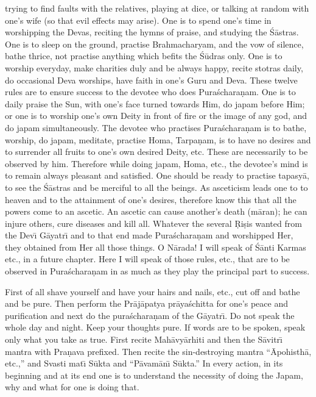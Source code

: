trying to find faults with the relatives, playing at dice, or talking at random with one's wife (so that evil effects may arise). One is to spend one's time in worshipping the Devas, reciting the hymns of praise, and studying the \'S\=astras. One is to sleep on the ground, practise Brahmacharyam, and the vow of silence, bathe thrice, not practise anything which befits the \'S\=udras only. One is to worship everyday, make charities duly and be always happy, recite stotras daily, do occasional Deva worships, have faith in one's Guru and Deva. These twelve rules are to ensure success to the devotee who does Pura\'schara\d{n}am. One is to daily praise the Sun, with one's face turned towards Him, do japam before Him; or one is to worship one's own Deity in front of fire or the image of any god, and do japam simultaneously. The devotee who practises Pura\'schara\d{n}am is to bathe, worship, do japam, meditate, practise Homa, Tarpa\d{n}am, is to have no desires and to surrender all fruits to one's own desired Deity, etc. These are necessarily to be observed by him. Therefore while doing japam, Homa, etc., the devotee's mind is to remain always pleasant and satisfied. One should be ready to practise tapasy\=a, to see the \'S\=astras and be merciful to all the beings. As asceticism leads one to to heaven and to the attainment of one's desires, therefore know this that all the powers come to an ascetic. An ascetic can cause another's death (m\=aran); he can injure others, cure diseases and kill all. Whatever the several \d{R}i\d{s}is wanted from the Dev\={\i} G\=ayatr\={\i} and to that end made Pura\'schara\d{n}am and worshipped Her, they obtained from Her all those things. O N\=arada! I will speak of \'S\=anti Karmas etc., in a future chapter. Here I will speak of those rules, etc., that are to be observed in Pura\'schara\d{n}am in as much as they play the principal part to success.

First of all shave yourself and have your hairs and nails, etc., cut off and bathe and be pure. Then perform the Pr\=aj\=apatya pr\=aya\'schitta for one's peace and purification and next do the pura\'schara\d{n}am of the G\=ayatr\={\i}. Do not speak the whole day and night. Keep your thoughts pure. If words are to be spoken, speak only what you take as true. First recite Mah\=avy\=arhiti and then the S\=avitr\={\i} mantra with Pra\d{n}ava prefixed. Then recite the sin-destroying mantra ``\=Apohisth\=a, etc.,'' and Svasti mat\={\i} S\=ukta and ``P\=avam\=an\={\i} S\=ukta.'' In every action, in its beginning and at its end one is to understand the necessity of doing the Japam, why and what for one is doing that.

